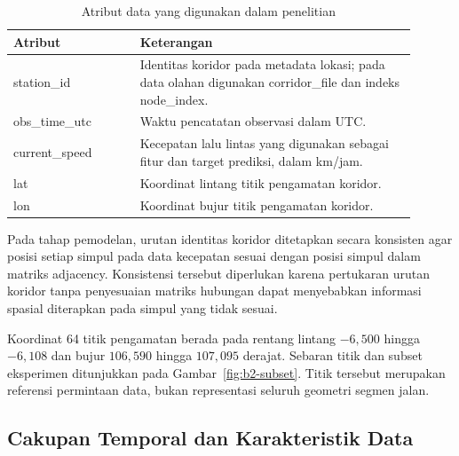 \begin{table}[htbp]
    \centering
    \caption{Atribut data yang digunakan dalam penelitian}
    \label{tab:b3-atribut-data}
    \normalsize
    \renewcommand{\arraystretch}{1.2}
    \begin{tabular}{>{\raggedright\arraybackslash}p{0.29\linewidth}>{\raggedright\arraybackslash}p{0.61\linewidth}}
        \hline
        \textbf{Atribut} & \textbf{Keterangan} \\
        \hline
        \textrm{station\_id} &
        Identitas koridor pada metadata lokasi; pada data olahan digunakan \textrm{corridor\_file} dan indeks \textrm{node\_index}. \\
        
        \textrm{obs\_time\_utc} &
        Waktu pencatatan observasi dalam UTC. \\
        
        \textrm{current\_speed} &
        Kecepatan lalu lintas yang digunakan sebagai fitur dan target prediksi, dalam km/jam. \\
        
        \textrm{lat} &
        Koordinat lintang titik pengamatan koridor. \\
        
        \textrm{lon} &
        Koordinat bujur titik pengamatan koridor. \\
        \hline
    \end{tabular}
\end{table}

Pada tahap pemodelan, urutan identitas koridor ditetapkan secara konsisten agar posisi setiap simpul pada data kecepatan sesuai dengan posisi simpul dalam matriks adjacency. Konsistensi tersebut diperlukan karena pertukaran urutan koridor tanpa penyesuaian matriks hubungan dapat menyebabkan informasi spasial diterapkan pada simpul yang tidak sesuai.

Koordinat 64 titik pengamatan berada pada rentang lintang $-6{,}500$ hingga $-6{,}108$ dan bujur $106{,}590$ hingga $107{,}095$ derajat. Sebaran titik dan subset eksperimen ditunjukkan pada Gambar~\ref{fig:b2-subset}. Titik tersebut merupakan referensi permintaan data, bukan representasi seluruh geometri segmen jalan.



\subsection{Cakupan Temporal dan Karakteristik Data}
\label{subsec:cakupan_temporal}

